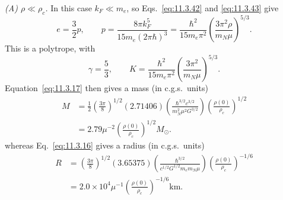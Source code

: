 \emph{(A) \(\rho\ll\rho_c\).} In this case \(k_F\ll m_e\), so
Eqs.~\eqref{eq:11.3.42} and \eqref{eq:11.3.43} give
\[
  e=\frac32p,
  \qquad
  p
  =
  \frac{8\pi k_F^5}{15m_e(2\pi\hbar)^3}
  =
  \frac{\hbar^2}{15m_e\pi^2}
  \left(\frac{3\pi^2\rho}{m_N\mu}\right)^{5/3}.
\]
This is a polytrope, with
\begin{equation}
  \gamma=\frac53,\qquad
  K
  =
  \frac{\hbar^2}{15m_e\pi^2}
  \left(\frac{3\pi^2}{m_N\mu}\right)^{5/3}.
  \tag{11.3.45}\label{eq:11.3.45}
\end{equation}
Equation~\eqref{eq:11.3.17} then gives a mass (in c.g.s.\ units)
\begin{equation}
  \begin{split}
  M
  &=
  \frac12\left(\frac{3\pi}{8}\right)^{1/2}(2.71406)
  \left(
    \frac{\hbar^{3/2}c^{3/2}}
    {m_N^2\mu^2G^{3/2}}
  \right)
  \left(\frac{\rho(0)}{\rho_c}\right)^{1/2}\\
  &=
  2.79\mu^{-2}
  \left(\frac{\rho(0)}{\rho_c}\right)^{1/2}M_\odot.
  \end{split}
  \tag{11.3.46}\label{eq:11.3.46}
\end{equation}
whereas Eq.~\eqref{eq:11.3.16} gives a radius (in c.g.s.\ units)
\begin{equation}
  \begin{split}
  R
  &=
  \left(\frac{3\pi}{8}\right)^{1/2}(3.65375)
  \left(
    \frac{\hbar^{3/2}}
    {c^{1/2}G^{1/2}m_em_N\mu}
  \right)
  \left(\frac{\rho(0)}{\rho_c}\right)^{-1/6}\\
  &=
  2.0\times10^4\mu^{-1}
  \left(\frac{\rho(0)}{\rho_c}\right)^{-1/6}\mathrm{km}.
  \end{split}
  \tag{11.3.47}\label{eq:11.3.47}
\end{equation}

